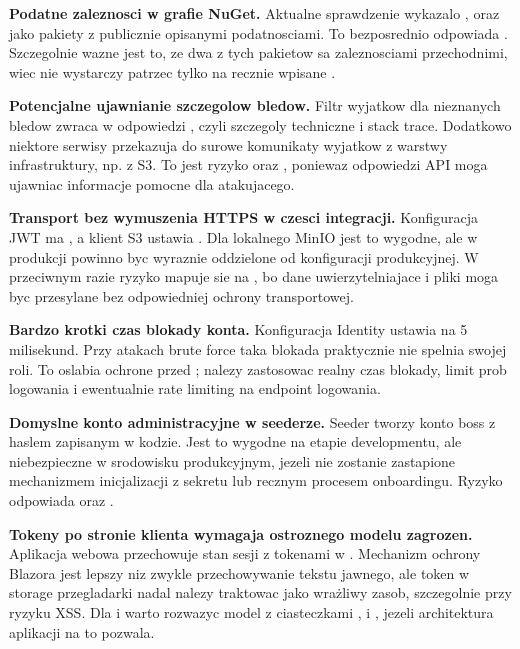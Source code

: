 \documentclass[12pt,a4paper]{article}
\begin{document}
\textbf{Podatne zaleznosci w grafie NuGet.} Aktualne sprawdzenie wykazalo ,  oraz  jako pakiety z publicznie opisanymi podatnosciami. To bezposrednio odpowiada . Szczegolnie wazne jest to, ze dwa z tych pakietow sa zaleznosciami przechodnimi, wiec nie wystarczy patrzec tylko na recznie wpisane .

\textbf{Potencjalne ujawnianie szczegolow bledow.} Filtr wyjatkow dla nieznanych bledow zwraca w odpowiedzi , czyli szczegoly techniczne i stack trace. Dodatkowo niektore serwisy przekazuja do  surowe komunikaty wyjatkow z warstwy infrastruktury, np. z S3. To jest ryzyko  oraz , poniewaz odpowiedzi API moga ujawniac informacje pomocne dla atakujacego.

\textbf{Transport bez wymuszenia HTTPS w czesci integracji.} Konfiguracja JWT ma , a klient S3 ustawia . Dla lokalnego MinIO jest to wygodne, ale w produkcji powinno byc wyraznie oddzielone od konfiguracji produkcyjnej. W przeciwnym razie ryzyko mapuje sie na , bo dane uwierzytelniajace i pliki moga byc przesylane bez odpowiedniej ochrony transportowej.

\textbf{Bardzo krotki czas blokady konta.} Konfiguracja Identity ustawia  na 5 milisekund. Przy atakach brute force taka blokada praktycznie nie spelnia swojej roli. To oslabia ochrone przed ; nalezy zastosowac realny czas blokady, limit prob logowania i ewentualnie rate limiting na endpoint logowania.

\textbf{Domyslne konto administracyjne w seederze.} Seeder tworzy konto boss z haslem zapisanym w kodzie. Jest to wygodne na etapie developmentu, ale niebezpieczne w srodowisku produkcyjnym, jezeli nie zostanie zastapione mechanizmem inicjalizacji z sekretu lub recznym procesem onboardingu. Ryzyko odpowiada  oraz .

\textbf{Tokeny po stronie klienta wymagaja ostroznego modelu zagrozen.} Aplikacja webowa przechowuje stan sesji z tokenami w . Mechanizm ochrony Blazora jest lepszy niz zwykle przechowywanie tekstu jawnego, ale token w storage przegladarki nadal nalezy traktowac jako wrażliwy zasob, szczegolnie przy ryzyku XSS. Dla  i  warto rozwazyc model z ciasteczkami ,  i , jezeli architektura aplikacji na to pozwala.
\end{document}
